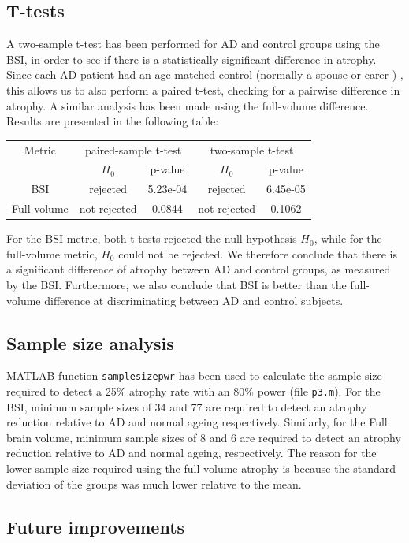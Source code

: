 \documentclass[11pt,a4paper,oneside]{report}
\begin{document}
\subsection*{T-tests}

A two-sample t-test has been performed for AD and control groups using the BSI, in order to see if there is a statistically significant difference in atrophy. Since each AD patient had an age-matched control (normally a spouse or carer ) \cite{malone2013miriad}, this allows us to also perform a paired t-test, checking for a pairwise difference in atrophy. A similar analysis has been made using the full-volume difference. Results are presented in the following table:\\

\begin{center}
 \begin{tabular}{c | c | c | c | c}
 Metric & \multicolumn{2}{c|}{paired-sample t-test} & \multicolumn{2}{c}{two-sample t-test}\\  
 & $H_0$ & p-value & $H_0$ & p-value\\
 \hline
 BSI & \cellcolor{green!15} rejected & 5.23e-04& \cellcolor{green!15}rejected & 6.45e-05\\
 Full-volume & \cellcolor{red!15} not rejected & 0.0844 & \cellcolor{red!15} not rejected & 0.1062\\
 
 \end{tabular}
\end{center}

For the BSI metric, both t-tests rejected the null hypothesis $H_0$, while for the full-volume metric, $H_0$ could not be rejected. We therefore conclude that there is a significant difference of atrophy between AD and control groups, as measured by the BSI. Furthermore, we also conclude that BSI is better than the full-volume difference at discriminating between AD and control subjects. 

\subsection*{Sample size analysis}

MATLAB function \texttt{samplesizepwr} has been used to calculate the sample size required to detect a 25\% atrophy rate with an 80\% power (file \texttt{p3.m}). For the BSI, minimum sample sizes of 34 and 77 are required to detect an atrophy reduction relative to AD and normal ageing respectively. Similarly, for the Full brain volume, minimum sample sizes of 8 and 6 are required to detect an atrophy reduction relative to AD and normal ageing, respectively. The reason for the lower sample size required using the full volume atrophy is because the standard deviation of the groups was much lower relative to the mean.



\subsection*{Future improvements}




\end{document}
